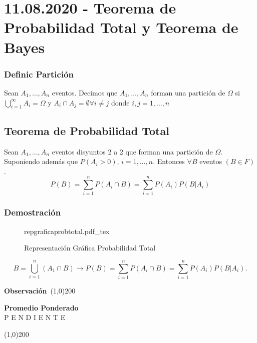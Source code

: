 \documentclass[a4paper]{book}
\newcommand{\incfig}[2][0.7]{%
    \def\svgwidth{#1\columnwidth}
    {#2.pdf_tex}
}
\newenvironment{obs}
    {
        \begin{flushleft}
       \textbf{Observación}\
        \line(1,0){200} \
        \end{flushleft}
    }
    {
        \begin{flushright}
        \line(1,0){200}
        \end{flushright}
    }
\begin{document}
\section{11.08.2020 - Teorema de Probabilidad Total y Teorema de Bayes}
\label{sec:teorema_de_probabilidad_total_y_teorema_de_bayes}

\subsubsection{Definic Partición}
\label{ssec:definicion_de_particion}

Sean \(A_{1},\ldots,A_{n}\) eventos. Decimos que \(A_{1},\ldots,A_{n}\) forman
una partición de \(\Omega\) si \(\bigcup_{i=1}^{\infty}A_{i}=\Omega\) y
\(A_{i}\cap A_{j}=\emptyset \forall i\neq j\) donde \(i,j=1,\ldots,n\)

\subsection{Teorema de Probabilidad Total}
\label{ssec:teorema_de_probabilidad_total}

Sean \(A_{1},\ldots,A_{n}\) eventos disyuntos 2 a 2 que forman una partición de
\(\Omega \). Suponiendo además que \(P\left( A_{i}>0\right) \), \(i=1,\ldots,n\). Entonces \(\forall B\) eventos \(\left( B\in F \right) \).
\[
    P\left( B \right) =\sum_{i=1}^{n} P\left(A_{i}\cap B\right)=\sum_{i=1}^{n} P\left( A_{i} \right) P\left( B|A_{i} \right)
\]
\subsubsection{Demostración}

\begin{figure}[ht]
    \centering
    \incfig{repgraficaprobtotal}
    \caption{Representación Gráfica Probabilidad Total}
    \label{fig:repgraficaprobtotal}
\end{figure}

\[
    B=\bigcup_{i=1}^{n}\left( A_{1}\cap B \right) \to P\left(B\right)=\sum_{i=1}^{n} P\left(A_{i}\cap B \right)=\sum_{i=1}^{n} P\left( A_{i} \right) P\left(B|A_{i}\right)
.\]

\begin{obs}
    \begin{center}
    \textbf{Promedio Ponderado}\\
    P E N D I E N T E
    \end{center}
\end{obs}
\end{document}
